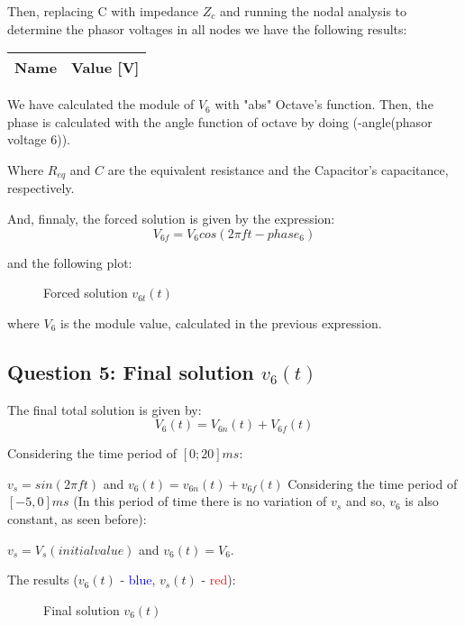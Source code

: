 Then, replacing C with  impedance $Z_c$ and running the nodal analysis to determine the phasor voltages in all nodes we have the following results:\par

\begin{center}
  \begin{tabular}{ | c | c | }
    \hline    
    {\bf Name} & {\bf Value [V]} \\ \hline
    \hline
  \end{tabular}
\end{center}

We have calculated the module of $V_6$ with "abs" Octave's function. Then, the phase is calculated with the angle function of octave by doing (-angle(phasor voltage 6)). \par

Where $R_{eq}$ and $C$ are the equivalent resistance and the Capacitor's capacitance, respectively.

And, finnaly, the forced solution is given by the expression:
\begin{equation}
     V_{6f}= V_6cos({2\pi f}{t} - phase_6)
\end{equation}\par
and the following plot:\par

\begin{figure}[H] \centering
\caption{Forced solution $v_{6t}(t)$}
\label{fig:plot4}
\end{figure}

where $V_6$ is the module value, calculated in the previous expression.



\subsection{Question 5: Final solution $v_{6}(t)$ }
The final total solution is given by:
\begin{equation}
     V_6(t) = V_{6n}(t) + V_{6f}(t)
\end{equation}\par
Considering the time period of $[0 ; 20]ms$: \par $v_s = sin(2\pi ft)$ and $v_6(t)= v_{6n}(t) + v_{6f}(t)$
Considering the time period of $[-5,0]ms$ (In this period of time there is no variation of $v_s$ and so, $v_6$ is also constant, as seen before):\par $v_s = V_s (initial value)$ and $v_6(t) =V_6$.\par
The results ($v_6(t)$ - \textcolor{blue}{blue}, $v_s (t)$ - \textcolor{red}{red}):
\begin{figure}[H] \centering
\caption{Final solution $v_{6}(t)$}
\label{fig:plot5}
\end{figure}

